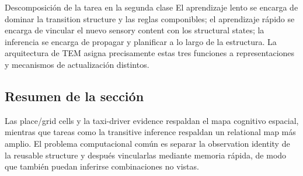 

\begin{importantbox}{Descomposición de la tarea en la segunda clase}
El aprendizaje lento se encarga de dominar la transition structure y las reglas componibles; el aprendizaje rápido se encarga de vincular el nuevo sensory content con los structural states; la inferencia se encarga de propagar y planificar a lo largo de la estructura. La arquitectura de TEM asigna precisamente estas tres funciones a representaciones y mecanismos de actualización distintos.
\end{importantbox}

\subsection{Resumen de la sección}

Las place/grid cells y la taxi-driver evidence respaldan el mapa cognitivo espacial, mientras que tareas como la transitive inference respaldan un relational map más amplio. El problema computacional común es separar la observation identity de la reusable structure y después vincularlas mediante memoria rápida, de modo que también puedan inferirse combinaciones no vistas.
